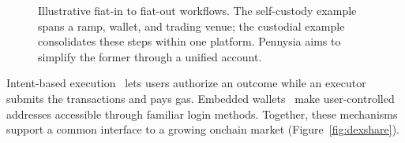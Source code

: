 \begin{figure}[H]
\caption{Illustrative fiat-in to fiat-out workflows. The self-custody example spans a ramp, wallet, and trading venue; the custodial example consolidates these steps within one platform. Pennysia aims to simplify the former through a unified account.}
\label{fig:journey}
\end{figure}

Intent-based execution~\cite{intentauction} lets users authorize an outcome while an executor submits the transactions and pays gas. Embedded wallets~\cite{smartaccounts} make user-controlled addresses accessible through familiar login methods. Together, these mechanisms support a common interface to a growing onchain market (Figure~\ref{fig:dexshare}).

